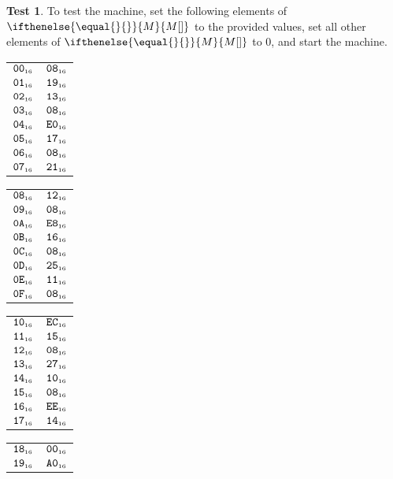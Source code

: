 \documentclass[a4paper,12pt]{article}
\makeatletter
\newcommand{\num}[1]{\texttt{#1}}
\newcommand{\hex}[1]{\num{#1}_{\textup{\tiny 16}}}
\newcommand{\MEM}[1]{\ifthenelse{\equal{#1}{}}{M}{M[#1]}}
\theoremstyle{definition}
\newtheorem{test}{Test}
\newenvironment{memtable}{%
  \begin{trivlist}
    \item
    }{%
    \end{trivlist}}
\newenvironment{memcolumn}{%
  \begin{tabular}{@{}ll@{}}
    \hline}
    {%
    \hline
  \end{tabular}}
\newcommand{\memspace}{\qquad}
\makeatother
\begin{document}
\begin{test}
  To test the machine, set the following elements of $\MEM{}$ to the provided values, set all other elements of $\MEM{}$ to 0, and start the machine.
  \begin{memtable}
    \begin{memcolumn}
      $\hex{00}$ & $\hex{08}$ \\
      $\hex{01}$ & $\hex{19}$ \\
      $\hex{02}$ & $\hex{13}$ \\
      $\hex{03}$ & $\hex{08}$ \\
      $\hex{04}$ & $\hex{E0}$ \\
      $\hex{05}$ & $\hex{17}$ \\
      $\hex{06}$ & $\hex{08}$ \\
      $\hex{07}$ & $\hex{21}$ \\
    \end{memcolumn}
    \memspace
    \begin{memcolumn}
      $\hex{08}$ & $\hex{12}$ \\
      $\hex{09}$ & $\hex{08}$ \\
      $\hex{0A}$ & $\hex{E8}$ \\
      $\hex{0B}$ & $\hex{16}$ \\
      $\hex{0C}$ & $\hex{08}$ \\
      $\hex{0D}$ & $\hex{25}$ \\
      $\hex{0E}$ & $\hex{11}$ \\
      $\hex{0F}$ & $\hex{08}$ \\
    \end{memcolumn}
    \memspace
    \begin{memcolumn}
      $\hex{10}$ & $\hex{EC}$ \\
      $\hex{11}$ & $\hex{15}$ \\
      $\hex{12}$ & $\hex{08}$ \\
      $\hex{13}$ & $\hex{27}$ \\
      $\hex{14}$ & $\hex{10}$ \\
      $\hex{15}$ & $\hex{08}$ \\
      $\hex{16}$ & $\hex{EE}$ \\
      $\hex{17}$ & $\hex{14}$ \\
    \end{memcolumn}
    \memspace
    \begin{memcolumn}
      $\hex{18}$ & $\hex{00}$ \\
      $\hex{19}$ & $\hex{A0}$ \\

\end{memcolumn}
\end{memtable}
\end{test}
\end{document}
